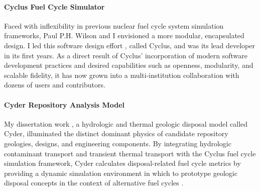 \documentclass[a4paper, 10pt]{article}
\begin{document}
\paragraph{Cyclus Fuel Cycle Simulator} Faced with inflexibility in previous 
nuclear fuel cycle system simulation frameworks, Paul P.H. Wilson and I 
envisioned a more modular, encapsulated design. I led this software design effort 
\cite{huff_open_2011, huff_cyclus_2011}, called Cyclus, and was its lead 
developer in its first years.  As a direct result of 
Cyclus' incorporation of modern software development practices and desired 
capabilities such as openness, modularity, and scalable fidelity, it has now 
grown into a multi-institution collaboration with dozens of users and 
contributors. 

\paragraph{Cyder Repository Analysis Model}


My dissertation work \cite{huff_integrated_2013}, a hydrologic and thermal 
geologic disposal model called Cyder, illuminated the distinct dominant physics 
of candidate repository geologies, designs, and engineering components. By 
integrating hydrologic contaminant transport \cite{huff_sensitivity_2012} and 
transient thermal transport \cite{huff_numerical_2012} with the Cyclus fuel 
cycle simulation framework, Cyder calculates disposal-related fuel cycle metrics 
by providing a dynamic simulation environment in which to prototype geologic 
disposal concepts in the context of alternative fuel cycles 
\cite{huff_cyclus_2013}.  

%
%
\end{document}
